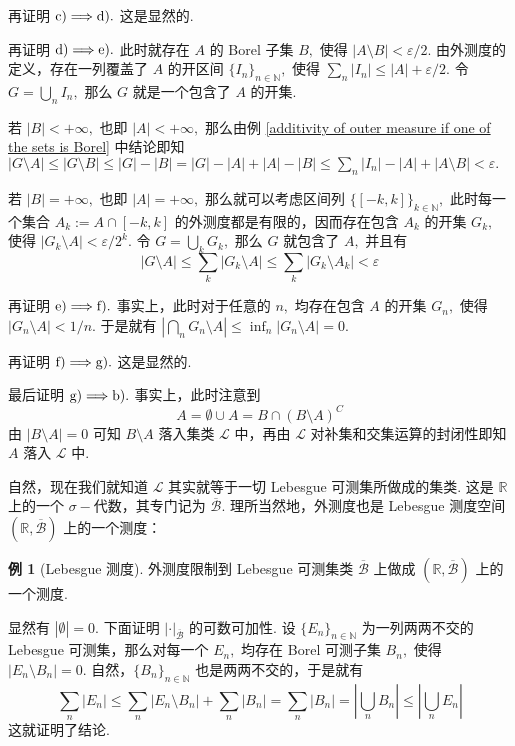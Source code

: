 \documentclass[12pt, a4paper, oneside]{book}
\numberwithin{figure}{section}
\theoremstyle{definition}
\newtheorem{example}[theorem]{例}
\begin{document}
再证明 $\rm c)\Longrightarrow d).$ 这是显然的.

再证明 $\rm d)\Longrightarrow e).$ 此时就存在 $A$ 的 Borel 子集 $B,$ 使得 $|A\setminus B|<\varepsilon/2.$ 由外测度的定义，存在一列覆盖了 $A$ 的开区间 $\{I_n\}_{n\in\mathbb N},$ 使得
$\sum_n |I_n|\leq |A|+\varepsilon/2.$ 令 $G=\bigcup_n I_n,$ 那么 $G$ 就是一个包含了 $A$ 的开集. 

若 $|B|<+\infty,$ 也即 $|A|<+\infty,$ 那么由例 \ref{additivity of outer measure if one of the sets is Borel} 中结论即知
$|G\setminus A|\leq |G\setminus B|\leq |G|-|B|=|G|-|A|+|A|-|B|\leq \sum_n |I_n|-|A|+|A\setminus B|<\varepsilon.$

若 $|B|=+\infty,$ 也即 $|A|=+\infty,$ 那么就可以考虑区间列 $\{[-k,k]\}_{k\in\mathbb N},$ 此时每一个集合 $A_k:=A\cap[-k,k]$ 的外测度都是有限的，因而存在包含 $A_k$ 的开集 $G_k,$ 使得 
$|G_k\setminus A|<\varepsilon/2^k.$ 令 $G=\bigcup_k G_k,$ 那么 $G$ 就包含了 $A,$ 并且有
\begin{equation}
    \left|G\setminus A\right|\leq\sum_k |G_k\setminus A|\leq \sum_k |G_k\setminus A_k|<\varepsilon
\end{equation}

再证明 $\rm e)\Longrightarrow f).$ 事实上，此时对于任意的 $n,$ 均存在包含 $A$ 的开集 $G_n,$ 使得 $|G_n\setminus A|<1/n.$ 于是就有 
$|\bigcap_n G_n\setminus A|\leq \inf_n |G_n\setminus A|=0.$

再证明 $\rm f)\Longrightarrow g).$ 这是显然的.

最后证明 $\rm g)\Longrightarrow b).$ 事实上，此时注意到 
\begin{equation}
    A = \emptyset\cup A=B\cap(B\setminus A)^C
\end{equation}
由 $|B\setminus A|=0$ 可知 $B\setminus A$ 落入集类 $\mathcal L$ 中，再由 $\mathcal L$ 对补集和交集运算的封闭性即知 $A$ 落入 $\mathcal L$ 中.



自然，现在我们就知道 $\mathcal L$ 其实就等于一切 Lebesgue 可测集所做成的集类. 这是 $\mathbb R$ 上的一个 $\sigma-$代数，其专门记为 $\overline{\mathcal B}.$ 理所当然地，外测度也是 Lebesgue 测度空间 $(\mathbb R,\overline{\mathcal B})$ 上的一个测度：
\begin{example}[Lebesgue 测度]
    外测度限制到 Lebesgue 可测集类 $\overline{\mathcal B}$ 上做成 $(\mathbb R,\overline{\mathcal B})$ 上的一个测度.
\end{example}

显然有 $|\emptyset|=0.$ 下面证明 $|\cdot|_{\overline{\mathcal B}}$ 的可数可加性. 设 $\{E_n\}_{n\in\mathbb N}$ 为一列两两不交的 Lebesgue 可测集，那么对每一个 $E_n,$ 均存在 Borel 可测子集 $B_n,$ 使得
$|E_n\setminus B_n|=0.$ 自然，$\{B_n\}_{n\in\mathbb N}$ 也是两两不交的，于是就有
\begin{equation}
    \sum_n |E_n|\leq \sum_n |E_n\setminus B_n|+\sum_n |B_n|=\sum_n |B_n|= \left|\bigcup_n B_n\right|\leq \left|\bigcup_n E_n\right|
\end{equation}
这就证明了结论.
\end{document}
